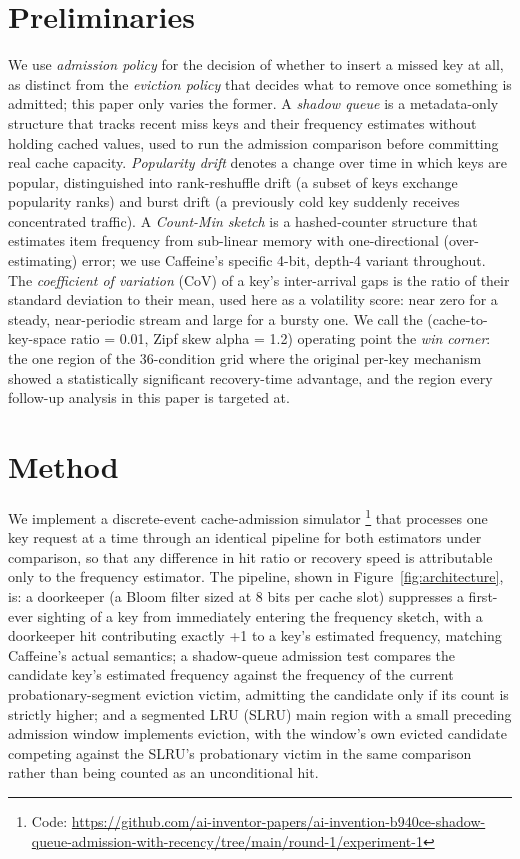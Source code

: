 \documentclass[11pt,letterpaper]{article}
\begin{document}
\section{Preliminaries}

We use \emph{admission policy} for the decision of whether to insert a missed key at all, as distinct from the \emph{eviction policy} that decides what to remove once something is admitted; this paper only varies the former. A \emph{shadow queue} is a metadata-only structure that tracks recent miss keys and their frequency estimates without holding cached values, used to run the admission comparison before committing real cache capacity. \emph{Popularity drift} denotes a change over time in which keys are popular, distinguished into rank-reshuffle drift (a subset of keys exchange popularity ranks) and burst drift (a previously cold key suddenly receives concentrated traffic). A \emph{Count-Min sketch} is a hashed-counter structure that estimates item frequency from sub-linear memory with one-directional (over-estimating) error; we use Caffeine's specific 4-bit, depth-4 variant throughout. The \emph{coefficient of variation} (CoV) of a key's inter-arrival gaps is the ratio of their standard deviation to their mean, used here as a volatility score: near zero for a steady, near-periodic stream and large for a bursty one. We call the (cache-to-key-space ratio = 0.01, Zipf skew alpha = 1.2) operating point the \emph{win corner}: the one region of the 36-condition grid where the original per-key mechanism showed a statistically significant recovery-time advantage, and the region every follow-up analysis in this paper is targeted at.

\section{Method}

We implement a discrete-event cache-admission simulator \footnote{Code: \url{https://github.com/ai-inventor-papers/ai-invention-b940ce-shadow-queue-admission-with-recency/tree/main/round-1/experiment-1}} that processes one key request at a time through an identical pipeline for both estimators under comparison, so that any difference in hit ratio or recovery speed is attributable only to the frequency estimator. The pipeline, shown in Figure~\ref{fig:architecture}, is: a doorkeeper (a Bloom filter sized at 8 bits per cache slot) suppresses a first-ever sighting of a key from immediately entering the frequency sketch, with a doorkeeper hit contributing exactly +1 to a key's estimated frequency, matching Caffeine's actual semantics; a shadow-queue admission test compares the candidate key's estimated frequency against the frequency of the current probationary-segment eviction victim, admitting the candidate only if its count is strictly higher; and a segmented LRU (SLRU) main region with a small preceding admission window implements eviction, with the window's own evicted candidate competing against the SLRU's probationary victim in the same comparison rather than being counted as an unconditional hit.
\end{document}
